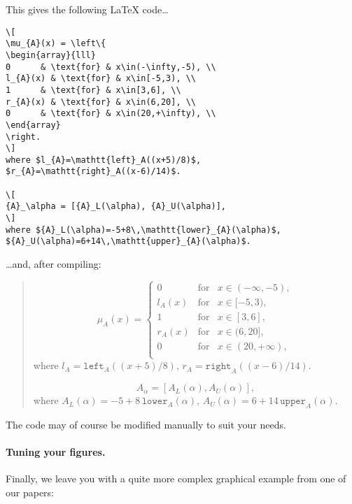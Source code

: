 \documentclass[11pt]{article}\usepackage[]{graphicx}\usepackage[]{color}
\makeatletter
\newenvironment{kframe}{%
 \def\at@end@of@kframe{}%
 \ifinner\ifhmode%
  \def\at@end@of@kframe{\end{minipage}}%
  \begin{minipage}{\columnwidth}%
 \fi\fi%
 \def\FrameCommand##1{\hskip\@totalleftmargin \hskip-\fboxsep
 \colorbox{shadecolor}{##1}\hskip-\fboxsep
     \hskip-\linewidth \hskip-\@totalleftmargin \hskip\columnwidth}%
 \MakeFramed {\advance\hsize-\width
   \@totalleftmargin\z@ \linewidth\hsize
   \@setminipage}}%
 {\par\unskip\endMakeFramed%
 \at@end@of@kframe}
\newenvironment{knitrout}{}{} %
\makeatother
\begin{document}
\noindent This gives the following \LaTeX{} code\dots
\begin{knitrout}\small
{}\color{fgcolor}\begin{kframe}
\begin{verbatim}
\[
\mu_{A}(x) = \left\{
\begin{array}{lll}
0      & \text{for} & x\in(-\infty,-5), \\
l_{A}(x) & \text{for} & x\in[-5,3), \\
1      & \text{for} & x\in[3,6], \\
r_{A}(x) & \text{for} & x\in(6,20], \\
0      & \text{for} & x\in(20,+\infty), \\
\end{array}
\right.
\]
where $l_{A}=\mathtt{left}_A((x+5)/8)$,
$r_{A}=\mathtt{right}_A((x-6)/14)$.

\[
{A}_\alpha = [{A}_L(\alpha), {A}_U(\alpha)],
\]
where ${A}_L(\alpha)=-5+8\,\mathtt{lower}_{A}(\alpha)$,
${A}_U(\alpha)=6+14\,\mathtt{upper}_{A}(\alpha)$.
\end{verbatim}
\end{kframe}
\end{knitrout}

\noindent \dots and, after compiling:

\begin{quote}
\[
\mu_{A}(x) = \left\{
\begin{array}{lll}
0      & \text{for} & x\in(-\infty,-5), \\
l_{A}(x) & \text{for} & x\in[-5,3), \\
1      & \text{for} & x\in[3,6], \\
r_{A}(x) & \text{for} & x\in(6,20], \\
0      & \text{for} & x\in(20,+\infty), \\
\end{array}
\right.
\]
where $l_{A}=\mathtt{left}_A((x+5)/8)$,
$r_{A}=\mathtt{right}_A((x-6)/14)$.

\[
{A}_\alpha = [{A}_L(\alpha), {A}_U(\alpha)],
\]
where ${A}_L(\alpha)=-5+8\,\mathtt{lower}_{A}(\alpha)$,
${A}_U(\alpha)=6+14\,\mathtt{upper}_{A}(\alpha)$.
\end{quote}

\noindent
The code may of course be modified manually to suit your needs.

\paragraph{Tuning your figures.}
Finally, we leave you with a quite more complex graphical
example from one of our papers:
\end{document}
